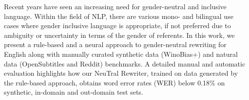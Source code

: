 Recent years have seen an increasing need for gender-neutral and inclusive language. Within the field of NLP, there are various mono- and bilingual use cases where gender inclusive language is appropriate, if not preferred due to ambiguity or uncertainty in terms of the gender of referents. In this work, we present a rule-based and a neural approach to gender-neutral rewriting for English along with manually curated synthetic data (WinoBias+) and natural data (OpenSubtitles and Reddit) benchmarks. A detailed manual and automatic evaluation highlights how our NeuTral Rewriter, trained on data generated by the rule-based approach, obtains word error rates (WER) below 0.18\% on synthetic, in-domain and out-domain test sets.
